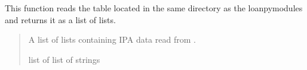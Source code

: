 \documentclass[letterpaper,10pt,english]{sphinxmanual}
\begin{document}

\begin{fulllineitems}
\label{\detokenize{documentation:loanpy.utils.read_ipa_all}}
\pysigstartsignatures
{}
\pysigstopsignatures
\sphinxAtStartPar
This function reads the  table located in the same
directory as the loanpy\sphinxhyphen{}modules and returns it as a list of lists.
\begin{quote}\begin{description}
\sphinxAtStartPar
A list of lists containing IPA data read from .

\sphinxAtStartPar
list of list of strings

\end{description}\end{quote}

\sphinxAtStartPar
{}


\end{fulllineitems}
\end{document}
